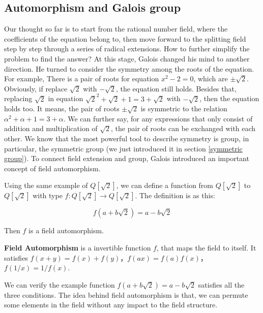 \documentclass[b5paper]{article}
\begin{document}
\begin{Exercise}
\end{Exercise}

\subsection{Automorphism and Galois group}

Our thought so far is to start from the rational number field, where the coefficients of the equation belong to, then move forward to the splitting field step by step through a series of radical extensions. How to further simplify the problem to find the answer? At this stage, Galois changed his mind to another direction. He turned to consider the symmetry among the roots of the equation. For example, There is a pair of roots for equation $x^2 - 2 = 0$, which are $\pm \sqrt{2}$. Obviously, if replace $\sqrt{2}$ with $-\sqrt{2}$, the equation still holds. Besides that, replacing $\sqrt{2}$ in equation $\sqrt{2}^2 + \sqrt{2} + 1 = 3 + \sqrt{2}$ with $-\sqrt{2}$, then the equation holds too. It means, the pair of roots $\pm \sqrt{2}$ is symmetric to the relation $\alpha^2 + \alpha + 1 = 3 + \alpha$. We can further say, for any expressions that only consist of addition and multiplication of $\sqrt{2}$, the pair of roots can be exchanged with each other. We know that the most powerful tool to describe symmetry is group, in particular, the symmetric group (we just introduced it in section \ref{symmetric group}). To connect field extension and group, Galois introduced an important concept of field automorphism.

Using the same example of $Q[\sqrt{2}]$, we can define a function from $Q[\sqrt{2}]$ to $Q[\sqrt{2}]$ with type $f: Q[\sqrt{2}] \to Q[\sqrt{2}]$. The definition is as this:

\[
f(a + b \sqrt{2}) = a - b \sqrt{2}
\]

Then $f$ is a field automorphism.

\begin{definition}
\textbf{Field Automorphism} is a invertible function $f$, that maps the field to itself. It satisfies $f(x + y) = f(x) + f(y)$，$f(ax) = f(a) f(x)$，$f(1/x) = 1/f(x)$.
\end{definition}

We can verify the example function $f(a + b \sqrt{2}) = a - b \sqrt{2}$ satisfies all the three conditions. The idea behind field automorphism is that, we can permute some elements in the field without any impact to the field structure.
\end{document}
